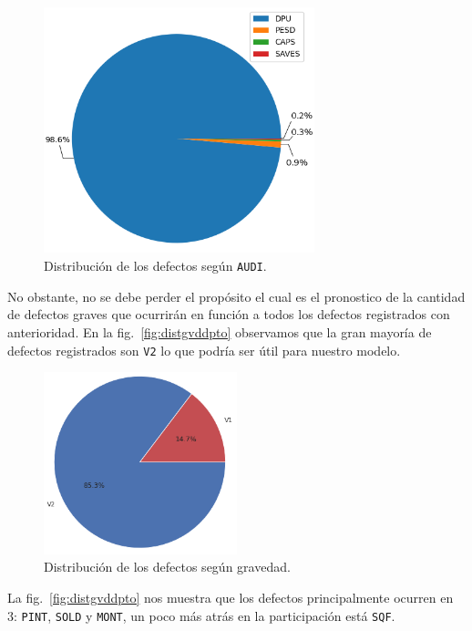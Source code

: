 \documentclass[a4paper,12pt]{article}
\begin{document}
\begin{figure}[H]
	\begin{center}				
	\includegraphics[width=0.7\textwidth]{audidist.png}
  	\caption{Distribución de los defectos según \texttt{AUDI}.}
  	\label{fig:distaudi}
  	\end{center}
\end{figure}

No obstante, no se debe perder el propósito el cual es el pronostico de la cantidad de defectos graves que ocurrirán en función a todos los defectos registrados con anterioridad. En la fig.~\ref{fig:distgvddpto} observamos que la gran mayoría de defectos registrados son \texttt{V2} lo que podría ser útil para nuestro modelo.

\begin{figure}[H]
	\begin{center}				
	\includegraphics[width=0.5\textwidth]{tesis_51.png}
  	\caption{Distribución de los defectos según gravedad.}
  	\label{fig:distgvd}
  	\end{center}
\end{figure}

La fig.~\ref{fig:distgvddpto} nos muestra que los defectos principalmente ocurren en 3: \texttt{PINT}, \texttt{SOLD} y \texttt{MONT}, un poco más atrás en la participación está \texttt{SQF}.
\end{document}
